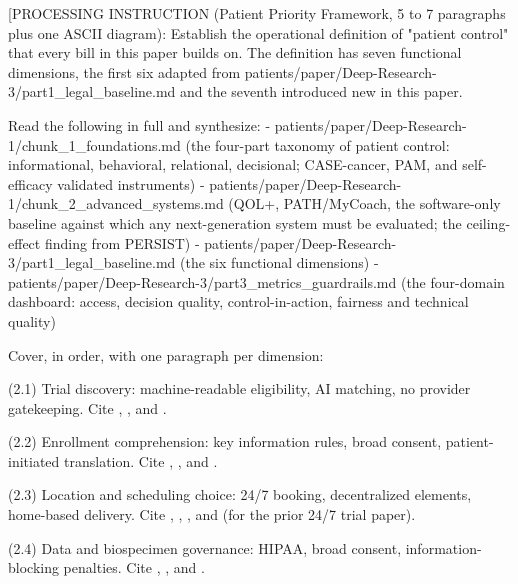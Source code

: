 
[PROCESSING INSTRUCTION (Patient Priority Framework, 5 to 7 paragraphs
plus one ASCII diagram): Establish the operational definition of
"patient control" that every bill in this paper builds on. The
definition has seven functional dimensions, the first six adapted from
patients/paper/Deep-Research-3/part1\_legal\_baseline.md and the seventh
introduced new in this paper.

Read the following in full and synthesize:
- patients/paper/Deep-Research-1/chunk\_1\_foundations.md
  (the four-part taxonomy of patient control: informational,
  behavioral, relational, decisional; CASE-cancer, PAM, and self-
  efficacy validated instruments)
- patients/paper/Deep-Research-1/chunk\_2\_advanced\_systems.md
  (QOL+, PATH/MyCoach, the software-only baseline against which any
  next-generation system must be evaluated; the ceiling-effect finding
  from PERSIST)
- patients/paper/Deep-Research-3/part1\_legal\_baseline.md (the six
  functional dimensions)
- patients/paper/Deep-Research-3/part3\_metrics\_guardrails.md (the
  four-domain dashboard: access, decision quality, control-in-action,
  fairness and technical quality)

Cover, in order, with one paragraph per dimension:

(2.1) Trial discovery: machine-readable eligibility, AI matching, no
provider gatekeeping. Cite \cite{jin2024trialgpt}, \cite{gupta2024prism},
and \cite{abdallah2026trialmatchai}.

(2.2) Enrollment comprehension: key information rules, broad consent,
patient-initiated translation. Cite \cite{fda_informed_consent_guidance_2023},
\cite{fda_ohrp_key_information_draft_2024}, and
\cite{ohrp_broad_consent_attachment_c_2017}.

(2.3) Location and scheduling choice: 24/7 booking, decentralized
elements, home-based delivery. Cite \cite{fda_dct_guidance_2024},
\cite{fda_oce_advancing_oncology_dct_2024},
\cite{dronca2026cancer_care_beyond_walls}, and
\cite{kawchak_2026_19994945} (for the prior 24/7 trial paper).

(2.4) Data and biospecimen governance: HIPAA, broad consent,
information-blocking penalties. Cite \cite{hhs_right_to_access_2025},
\cite{onc_cures_act_final_rule_page}, and
\cite{federal_register_info_blocking_disincentives_2024}.

